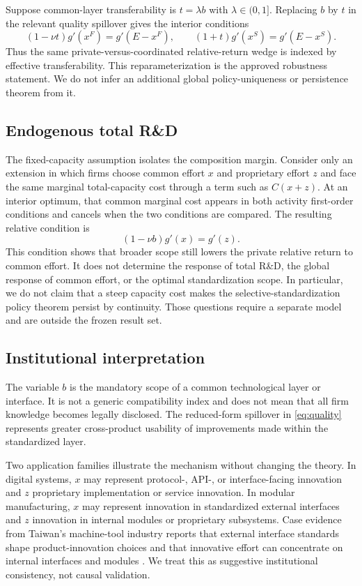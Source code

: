 Suppose common-layer transferability is $t=\lambda b$ with $\lambda\in(0,1]$. Replacing $b$ by $t$ in the relevant quality spillover gives the interior conditions
\begin{equation}
 (1-\nu t)g'(x^F)=g'(E-x^F),
 \qquad
 (1+t)g'(x^S)=g'(E-x^S).
\end{equation}
Thus the same private-versus-coordinated relative-return wedge is indexed by effective transferability. This reparameterization is the approved robustness statement. We do not infer an additional global policy-uniqueness or persistence theorem from it.

\subsection{Endogenous total R\&D}

The fixed-capacity assumption isolates the composition margin. Consider only an extension in which firms choose common effort $x$ and proprietary effort $z$ and face the same marginal total-capacity cost through a term such as $C(x+z)$. At an interior optimum, that common marginal cost appears in both activity first-order conditions and cancels when the two conditions are compared. The resulting relative condition is
\begin{equation}
 (1-\nu b)g'(x)=g'(z).
 \label{eq:endogenousErelative}
\end{equation}
This condition shows that broader scope still lowers the private relative return to common effort. It does not determine the response of total R\&D, the global response of common effort, or the optimal standardization scope. In particular, we do not claim that a steep capacity cost makes the selective-standardization policy theorem persist by continuity. Those questions require a separate model and are outside the frozen result set.

\subsection{Institutional interpretation}

The variable $b$ is the mandatory scope of a common technological layer or interface. It is not a generic compatibility index and does not mean that all firm knowledge becomes legally disclosed. The reduced-form spillover in \eqref{eq:quality} represents greater cross-product usability of improvements made within the standardized layer.

Two application families illustrate the mechanism without changing the theory. In digital systems, $x$ may represent protocol-, API-, or interface-facing innovation and $z$ proprietary implementation or service innovation. In modular manufacturing, $x$ may represent innovation in standardized external interfaces and $z$ innovation in internal modules or proprietary subsystems. Case evidence from Taiwan's machine-tool industry reports that external interface standards shape product-innovation choices and that innovative effort can concentrate on internal interfaces and modules \citep{ChenLiu2005}. We treat this as suggestive institutional consistency, not causal validation.

